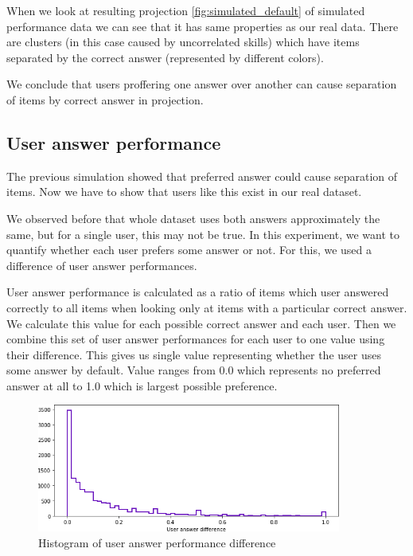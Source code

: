 \documentclass[
  digital, %
  table,   %
  nolof,     %
  nolot,     %
  nocover,
  color,
  final, %
]{fithesis3}
\begin{document}
When we look at resulting projection \ref{fig:simulated_default} of simulated performance data we can see that it has same properties as our real data. There are clusters (in this case caused by uncorrelated skills) which have items separated by the correct answer (represented by different colors).

We conclude that users proffering one answer over another can cause separation of items by correct answer in projection.


\subsection{User answer performance}\label{user-answer-performance}


The previous simulation showed that preferred answer could cause separation of items. Now we have to show that users like this exist in our real dataset.

We observed before that whole dataset uses both answers approximately the same, but for a single user, this may not be true. In this experiment, we want to quantify whether each user prefers some answer or not. For this, we used a difference of user answer performances.

User answer performance is calculated as a ratio of items which user answered correctly to all items when looking only at items with a particular correct answer. We calculate this value for each possible correct answer and each user. Then we combine this set of user answer performances for each user to one value using their difference. This gives us single value representing whether the user uses some answer by default. Value ranges from 0.0 which represents no preferred answer at all to 1.0 which is largest possible preference.

\begin{figure}
  \includegraphics[width=10cm]{img/uneven_answers_hist}
  \caption{Histogram of user answer performance difference}
  \label{fig:uneven_answers_hist}
\end{figure}
\end{document}
